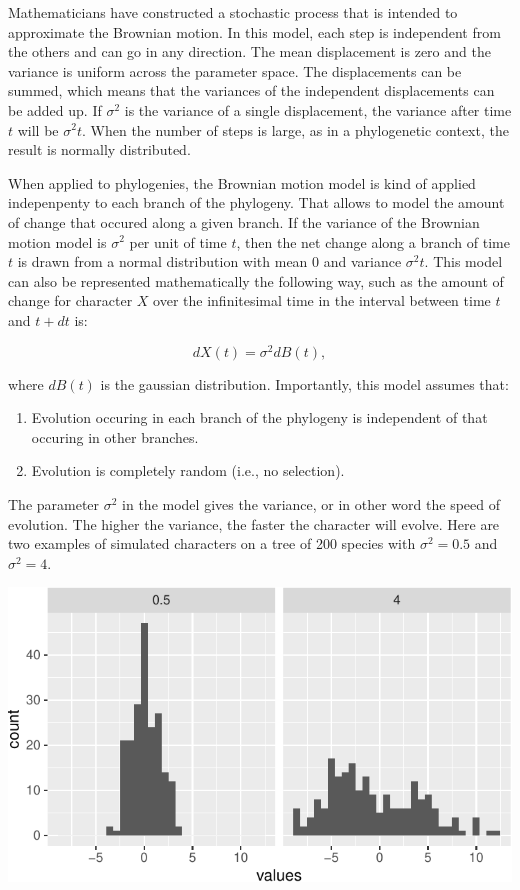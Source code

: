 \documentclass[
]{book}
\providecommand{\tightlist}{%
  \setlength{\itemsep}{0pt}\setlength{\parskip}{0pt}}
\begin{document}
Mathematicians have constructed a stochastic process that is intended to approximate the Brownian motion. In this model, each step is independent from the others and can go in any direction. The mean displacement is zero and the variance is uniform across the parameter space. The displacements can be summed, which means that the variances of the independent displacements can be added up. If \(\sigma^2\) is the variance of a single displacement, the variance after time \(t\) will be \(\sigma^2t\). When the number of steps is large, as in a phylogenetic context, the result is normally distributed.

When applied to phylogenies, the Brownian motion model is kind of applied indepenpenty to each branch of the phylogeny. That allows to model the amount of change that occured along a given branch. If the variance of the Brownian motion model is \(\sigma^2\) per unit of time \(t\), then the net change along a branch of time \(t\) is drawn from a normal distribution with mean \(0\) and variance \(\sigma^2t\). This model can also be represented mathematically the following way, such as the amount of change for character \(X\) over the infinitesimal time in the interval between time \(t\) and \(t+dt\) is:

\[dX(t)=\sigma^2 dB(t),\]

where \(dB(t)\) is the gaussian distribution. Importantly, this model assumes that:

\begin{enumerate}
\def\labelenumi{\arabic{enumi}.}
\tightlist
\item
  Evolution occuring in each branch of the phylogeny is independent of that occuring in other branches.
\item
  Evolution is completely random (i.e., no selection).
\end{enumerate}

The parameter \(\sigma^2\) in the model gives the variance, or in other word the speed of evolution. The higher the variance, the faster the character will evolve. Here are two examples of simulated characters on a tree of 200 species with \(\sigma^2=0.5\) and \(\sigma^2=4\).

\begin{center}\includegraphics{pcm-workshop_files/figure-latex/BM_Model_SigmaExample-1} \end{center}
\end{document}

